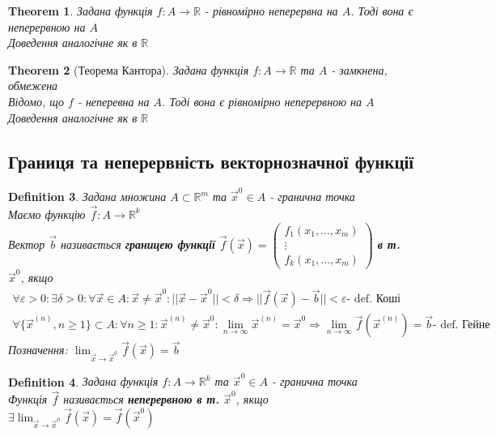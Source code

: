 \documentclass[a4paper, 14pt]{extarticle}
\def\huge{\displaystyle}
\theoremstyle{theoremdd}
\newtheorem{theorem}{Theorem}[subsection]
\theoremstyle{theoremdd}
\newtheorem{definition}[theorem]{Definition}
\theoremstyle{theoremdd}
\theoremstyle{theoremdd}
\theoremstyle{theoremdd}
\theoremstyle{theoremdd}
\theoremstyle{theoremdd}
\begin{document}
\begin{theorem}
Задана функція $f: A \to \mathbb{R}$ - рівномірно неперервна на $A$. Тоді вона є неперервною на $A$\\
\textit{Доведення аналогічне як в $\mathbb{R}$}
\end{theorem}

\begin{theorem}[Теорема Кантора]
Задана функція $f: A \to \mathbb{R}$ та $A$ - замкнена, обмежена\\
Відомо, що $f$ - неперевна на $A$. Тоді вона є рівномірно неперервною на $A$\\
\textit{Доведення аналогічне як в $\mathbb{R}$}
\end{theorem}

\subsection{Границя та неперервність векторнозначної функції}
\begin{definition}
Задана множина $A \subset \mathbb{R}^m$ та $\vec{x}^0 \in A$ - гранична точка\\
Маємо функцію $\vec{f}: A \to \mathbb{R}^k$\\
Вектор $\vec{b}$ називається \textbf{границею функції} $\vec{f}(\vec{x}) = \begin{pmatrix}
f_1(x_1,\dots,x_m) \\ \vdots \\ f_k(x_1,\dots,x_m)
\end{pmatrix}$ \textbf{в т.} $\vec{x}^0$, якщо
\begin{align*}
\forall \varepsilon > 0: \exists \delta > 0: \forall \vec{x} \in A: \vec{x} \neq \vec{x}^0: ||\vec{x} - \vec{x}^0 || < \delta \Rightarrow ||\vec{f}(\vec{x}) - \vec{b}|| < \varepsilon \textrm{- def. Коші}\\
\forall \{\vec{x}^{(n)}, n \geq 1\} \subset A: \forall n \geq 1: \vec{x}^{(n)} \neq \vec{x}^0: \huge \lim_{n \to \infty} \vec{x}^{(n)} = \vec{x}^0 \Rightarrow \lim_{n \to \infty} \vec{f}(\vec{x}^{(n)}) = \vec{b} \textrm{- def. Гейне}
\end{align*}
Позначення: $\huge \lim_{\vec{x} \to \vec{x}^0} \vec{f}(\vec{x}) = \vec{b}$
\end{definition}

\begin{definition}
Задана функція $f: A \to \mathbb{R}^k$ та $\vec{x}^0 \in A$ - гранична точка\\
Функція $\vec{f}$ називається \textbf{неперервною в т.} $\vec{x}^0$, якщо $\exists \huge \lim_{\vec{x} \to \vec{x}^0} \vec{f}(\vec{x}) = \vec{f}(\vec{x}^0)$
\end{definition}
\end{document}
